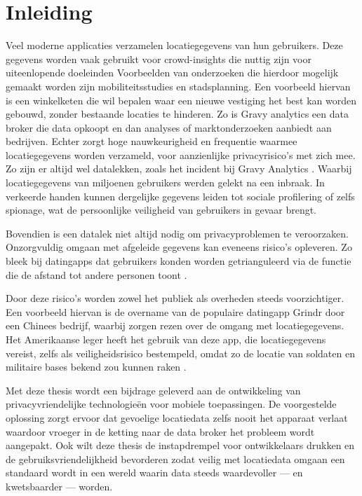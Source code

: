 \chapter{Inleiding}
Veel moderne applicaties verzamelen locatiegegevens van hun gebruikers. Deze gegevens worden vaak gebruikt voor crowd-insights die nuttig zijn voor uiteenlopende doeleinden
Voorbeelden van onderzoeken die hierdoor mogelijk gemaakt worden zijn mobiliteitsstudies en stadsplanning. Een voorbeeld hiervan is een winkelketen die wil bepalen waar een nieuwe vestiging het best kan worden gebouwd, zonder bestaande locaties te hinderen.
Zo is Gravy analytics een data broker die data opkoopt en dan analyses of marktonderzoeken aanbiedt aan bedrijven.
Echter zorgt hoge nauwkeurigheid en frequentie waarmee locatiegegevens worden verzameld, voor aanzienlijke privacyrisico’s met zich mee. Zo zijn er altijd wel datalekken, zoals het incident bij Gravy Analytics \cite{gravy_analytics}. Waarbij locatiegegevens van miljoenen gebruikers werden gelekt na een inbraak. In verkeerde handen kunnen dergelijke gegevens leiden tot sociale profilering of zelfs spionage, wat de persoonlijke veiligheid van gebruikers in gevaar brengt.

Bovendien is een datalek niet altijd nodig om privacyproblemen te veroorzaken. Onzorgvuldig omgaan met afgeleide gegevens kan eveneens risico’s opleveren. Zo bleek bij datingapps dat gebruikers konden worden getrianguleerd via de functie die de afstand tot andere personen toont \cite{bumble-triangulation}.

Door deze risico’s worden zowel het publiek als overheden steeds voorzichtiger. Een voorbeeld hiervan is de overname van de populaire datingapp Grindr door een Chinees bedrijf, waarbij zorgen rezen over de omgang met locatiegegevens. Het Amerikaanse leger heeft het gebruik van deze app, die locatiegegevens vereist, zelfs als veiligheidsrisico bestempeld, omdat zo de locatie van soldaten en militaire bases bekend zou kunnen raken \cite{grindr_locatie}.

Met deze thesis wordt een bijdrage geleverd aan de ontwikkeling van privacyvriendelijke technologieën voor mobiele toepassingen. De voorgestelde oplossing zorgt ervoor dat gevoelige locatiedata zelfs nooit het apparaat verlaat waardoor vroeger in de ketting naar de data broker het probleem wordt aangepakt. Ook wilt deze thesis de instapdrempel voor ontwikkelaars drukken en de gebruiksvriendelijkheid bevorderen zodat veilig met locatiedata omgaan een standaard wordt in een wereld waarin data steeds waardevoller — en kwetsbaarder — worden.
